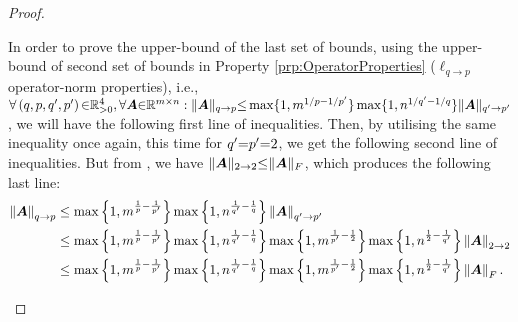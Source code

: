 \begin{proof}
\begin{itemize}
In order to prove the upper-bound of the last set of bounds, using the upper-bound of second set of bounds in Property \ref{prp:OperatorProperties} ($\ell_{q {\to} p}$ operator-norm properties), i.e., $\forall \left( q , p , q' , p' \right) {\in} \mathbb{R}^4_{>0} , \forall \boldsymbol{A} {\in} \mathbb{R}^{m {\times} n} : \Vert \boldsymbol{A} \Vert_{q \to p} {\leq} \max \{1 , m^{1/p {-} 1/{p'}} \} \max \{1 , n^{1/{q'} {-} 1/q} \} \Vert \boldsymbol{A} \Vert_{q' \to p'}$, we will have the following first line of inequalities.
Then, by utilising the same inequality once again, this time for $q' {=} p' {=} 2$, we get the following second line of inequalities.
But from \cite{Golub2013}, we have $\Vert \boldsymbol{A} \Vert_{2 \to 2} {\leq} \Vert \boldsymbol{A} \Vert_F$, which produces the following last line:
\begin{gather*}
\begin{aligned}
\mynorm{\boldsymbol{A}}_{q \to p} &\leq 
\max \mybrace{1 , m^{\frac1p - \frac{1}{p'}}} \max \mybrace{1 , n^{\frac{1}{q'} - \frac1q}} \mynorm{\boldsymbol{A}}_{q' \to p'} \\
&\leq \max \mybrace{1 , m^{\frac1p - \frac{1}{p'}}} \max \mybrace{1 , n^{\frac{1}{q'} - \frac1q}} \max \mybrace{1 , m^{\frac{1}{p'} - \frac12}} \max \mybrace{1 , n^{\frac12 - \frac{1}{q'}}} \mynorm{\boldsymbol{A}}_{2 \to 2} \\
&\leq \max \mybrace{1 , m^{\frac1p - \frac{1}{p'}}} \max \mybrace{1 , n^{\frac{1}{q'} - \frac1q}} \max \mybrace{1 , m^{\frac{1}{p'} -\frac12}} \max \mybrace{1 , n^{\frac{1}{2} - \frac{1}{q'}}} \mynorm{\boldsymbol{A}}_F.
\end{aligned}

\end{gather*}
\end{itemize}
\end{proof}
